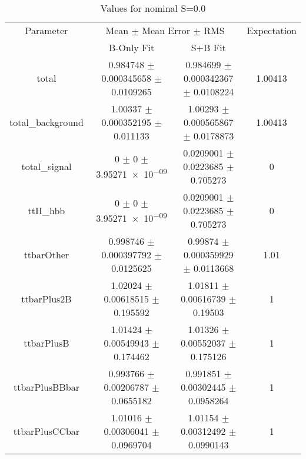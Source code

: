\begin{table}
\centering
\caption{Values for nominal S=0.0}
\begin{tabular}{cccc}
\toprule
Parameter & \multicolumn{2}{c}{Mean $\pm$ Mean Error $\pm$ RMS} & Expectation\\
 & B-Only Fit & S+B Fit & \\
\midrule
total & \num{0.984748} $\pm$ \num{0.000345658} $\pm$ \num{0.0109265} & \num{0.984699} $\pm$ \num{0.000342367} $\pm$ \num{0.0108224} & \num{1.00413}\\
total\_background & \num{1.00337} $\pm$ \num{0.000352195} $\pm$ \num{0.011133} & \num{1.00293} $\pm$ \num{0.000565867} $\pm$ \num{0.0178873} & \num{1.00413}\\
total\_signal & \num{0} $\pm$ \num{0} $\pm$ \num{3.95271e-09} & \num{0.0209001} $\pm$ \num{0.0223685} $\pm$ \num{0.705273} & \num{0}\\
ttH\_hbb & \num{0} $\pm$ \num{0} $\pm$ \num{3.95271e-09} & \num{0.0209001} $\pm$ \num{0.0223685} $\pm$ \num{0.705273} & \num{0}\\
ttbarOther & \num{0.998746} $\pm$ \num{0.000397792} $\pm$ \num{0.0125625} & \num{0.99874} $\pm$ \num{0.000359929} $\pm$ \num{0.0113668} & \num{1.01}\\
ttbarPlus2B & \num{1.02024} $\pm$ \num{0.00618515} $\pm$ \num{0.195592} & \num{1.01811} $\pm$ \num{0.00616739} $\pm$ \num{0.19503} & \num{1}\\
ttbarPlusB & \num{1.01424} $\pm$ \num{0.00549943} $\pm$ \num{0.174462} & \num{1.01326} $\pm$ \num{0.00552037} $\pm$ \num{0.175126} & \num{1}\\
ttbarPlusBBbar & \num{0.993766} $\pm$ \num{0.00206787} $\pm$ \num{0.0655182} & \num{0.991851} $\pm$ \num{0.00302445} $\pm$ \num{0.0958264} & \num{1}\\
ttbarPlusCCbar & \num{1.01016} $\pm$ \num{0.00306041} $\pm$ \num{0.0969704} & \num{1.01154} $\pm$ \num{0.00312492} $\pm$ \num{0.0990143} & \num{1}\\
\bottomrule
\end{tabular}
\end{table}
